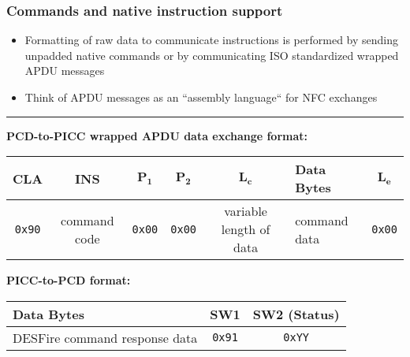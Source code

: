 \documentclass[usenames,svgnames,dvipsnames,11pt]{beamer}
\begin{document}
\begin{frame}[fragile]
\frametitle{Commands and native instruction support}

\begin{itemize}
\item Formatting of raw data to communicate instructions is performed by sending 
      unpadded native commands or by communicating ISO standardized wrapped APDU messages
\item Think of APDU messages as an ``assembly language`` for NFC exchanges 
\end{itemize}
\medskip 
\hrule
\medskip

     \scriptsize
     \textbf{\large{PCD-to-PICC wrapped APDU data exchange format:}}
     \begin{center}
     \begin{tabular}{|c|c|c|c|c|l|c|} 
     \hline
     \textbf{CLA} & \textbf{INS} & $\mathbf{P_1}$ & $\mathbf{P_2}$ & $\mathbf{L_c}$ & 
     \textbf{Data Bytes} & $\mathbf{L_e}$ \\ 
     \hline
     \texttt{0x90} & command code & \texttt{0x00} & \texttt{0x00} & variable length of data & 
     command data & \texttt{0x00} \\ 
     \hline
     \end{tabular}
     \end{center}
     \bigskip 
     \textbf{\large{PICC-to-PCD format:}}
     \begin{center}
     \begin{tabular}{|l|c|c|} 
     \hline 
     \textbf{Data Bytes} & \textbf{SW1} & \textbf{SW2 (Status)} \\ 
     \hline 
     DESFire command response data & 
     \texttt{0x91} & \texttt{0xYY} \\ 
     \hline 
     \end{tabular} 
     \end{center} 

\end{frame}
\end{document}
